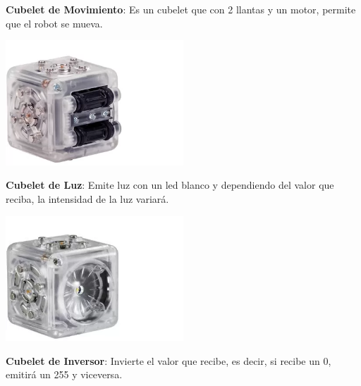 \begin{itemize}
\begin{minipage}
        \end{minipage}
        \begin{minipage}
            {0.5\textwidth}
            \item \textbf{Cubelet de Movimiento}: Es un cubelet que con 2 llantas y un motor, 
                permite que el robot se mueva.
        \end{minipage}
        \begin{minipage}
            {0.5\textwidth}
            \centering
            \includegraphics[width=0.5\textwidth]{./images/marco_teorico/cubelets/movimiento.png}
        \end{minipage}
        \begin{minipage}
            {0.5\textwidth}
            \item \textbf{Cubelet de Luz}: Emite luz con un led blanco y dependiendo del valor que 
                reciba, la intensidad de la luz variar\'a.
        \end{minipage}
        \begin{minipage}
            {0.5\textwidth}
            \centering
            \includegraphics[width=0.5\textwidth]{./images/marco_teorico/cubelets/luz.png}
        \end{minipage}
        \begin{minipage}
            {0.5\textwidth}
            \item \textbf{Cubelet de Inversor}: Invierte el valor que recibe, es decir, si recibe un 0,
                emitir\'a un 255 y viceversa.
        \end{minipage}

\end{itemize}
